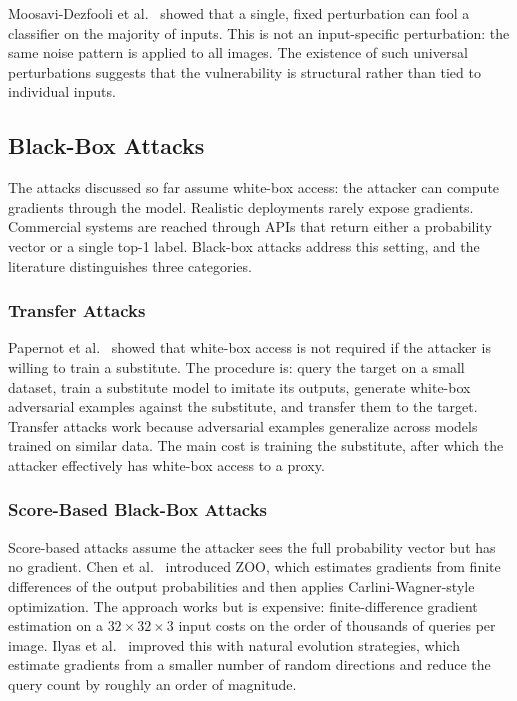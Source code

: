 Moosavi-Dezfooli et al.~\cite{moosavidezfooli2017universal} showed that a single, fixed perturbation can fool a classifier on the majority of inputs. This is not an input-specific perturbation: the same noise pattern is applied to all images. The existence of such universal perturbations suggests that the vulnerability is structural rather than tied to individual inputs.

\subsection{Black-Box Attacks}

The attacks discussed so far assume white-box access: the attacker can compute gradients through the model. Realistic deployments rarely expose gradients. Commercial systems are reached through APIs that return either a probability vector or a single top-1 label. Black-box attacks address this setting, and the literature distinguishes three categories.

\subsubsection{Transfer Attacks}

Papernot et al.~\cite{papernot2017practical} showed that white-box access is not required if the attacker is willing to train a substitute. The procedure is: query the target on a small dataset, train a substitute model to imitate its outputs, generate white-box adversarial examples against the substitute, and transfer them to the target. Transfer attacks work because adversarial examples generalize across models trained on similar data. The main cost is training the substitute, after which the attacker effectively has white-box access to a proxy.

\subsubsection{Score-Based Black-Box Attacks}

Score-based attacks assume the attacker sees the full probability vector but has no gradient. Chen et al.~\cite{chen2017zoo} introduced ZOO, which estimates gradients from finite differences of the output probabilities and then applies Carlini-Wagner-style optimization. The approach works but is expensive: finite-difference gradient estimation on a $32 \times 32 \times 3$ input costs on the order of thousands of queries per image. Ilyas et al.~\cite{ilyas2018blackbox} improved this with natural evolution strategies, which estimate gradients from a smaller number of random directions and reduce the query count by roughly an order of magnitude.

